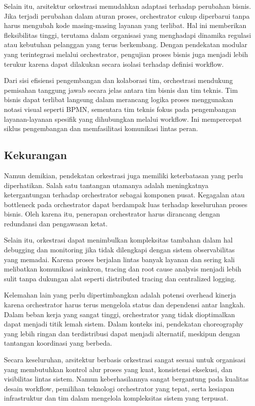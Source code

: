 Selain itu, arsitektur orkestrasi memudahkan adaptasi terhadap perubahan bisnis. Jika terjadi perubahan dalam aturan proses, orchestrator cukup diperbarui tanpa harus mengubah kode masing-masing layanan yang terlibat. Hal ini memberikan fleksibilitas tinggi, terutama dalam organisasi yang menghadapi dinamika regulasi atau kebutuhan pelanggan yang terus berkembang. Dengan pendekatan modular yang terintegrasi melalui orchestrator, pengujian proses bisnis juga menjadi lebih terukur karena dapat dilakukan secara isolasi terhadap definisi workflow.

Dari sisi efisiensi pengembangan dan kolaborasi tim, orchestrasi mendukung pemisahan tanggung jawab secara jelas antara tim bisnis dan tim teknis. Tim bisnis dapat terlibat langsung dalam merancang logika proses menggunakan notasi visual seperti BPMN, sementara tim teknis fokus pada pengembangan layanan-layanan spesifik yang dihubungkan melalui workflow. Ini mempercepat siklus pengembangan dan memfasilitasi komunikasi lintas peran.

\subsection{Kekurangan}
Namun demikian, pendekatan orkestrasi juga memiliki keterbatasan yang perlu diperhatikan. Salah satu tantangan utamanya adalah meningkatnya ketergantungan terhadap orchestrator sebagai komponen pusat. Kegagalan atau bottleneck pada orchestrator dapat berdampak luas terhadap keseluruhan proses bisnis. Oleh karena itu, penerapan orchestrator harus dirancang dengan redundansi dan pengawasan ketat.

Selain itu, orkestrasi dapat menimbulkan kompleksitas tambahan dalam hal debugging dan monitoring jika tidak dilengkapi dengan sistem observabilitas yang memadai. Karena proses berjalan lintas banyak layanan dan sering kali melibatkan komunikasi asinkron, tracing dan root cause analysis menjadi lebih sulit tanpa dukungan alat seperti distributed tracing dan centralized logging.

Kelemahan lain yang perlu dipertimbangkan adalah potensi overhead kinerja karena orchestrator harus terus mengelola status dan dependensi antar langkah. Dalam beban kerja yang sangat tinggi, orchestrator yang tidak dioptimalkan dapat menjadi titik lemah sistem. Dalam konteks ini, pendekatan choreography yang lebih ringan dan terdistribusi dapat menjadi alternatif, meskipun dengan tantangan koordinasi yang berbeda.

Secara keseluruhan, arsitektur berbasis orkestrasi sangat sesuai untuk organisasi yang membutuhkan kontrol alur proses yang kuat, konsistensi eksekusi, dan visibilitas lintas sistem. Namun keberhasilannya sangat bergantung pada kualitas desain workflow, pemilihan teknologi orchestrator yang tepat, serta kesiapan infrastruktur dan tim dalam mengelola kompleksitas sistem yang terpusat.


